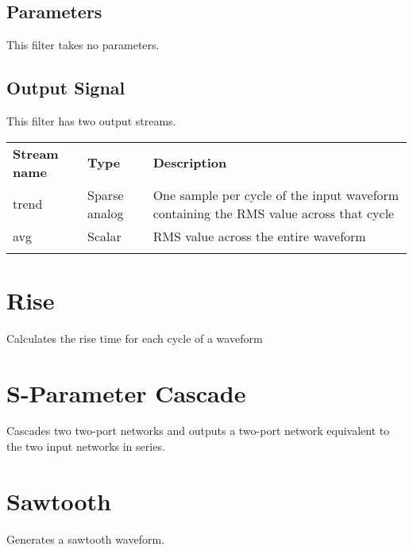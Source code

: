 \subsection{Parameters}

This filter takes no parameters.

\subsection{Output Signal}

This filter has two output streams.

\begin{tabularx}{16cm}{llX}
\thickhline
\textbf{Stream name} & \textbf{Type} & \textbf{Description} \\
\thickhline
trend & Sparse analog & One sample per cycle of the input waveform containing the RMS value across that cycle \\
\thinhline
avg & Scalar & RMS value across the entire waveform \\
\thickhline
\end{tabularx}

\pagebreak
\section{Rise}

Calculates the rise time for each cycle of a waveform

\pagebreak
\section{S-Parameter Cascade}
\label{filter:sparamcascade}

Cascades two two-port networks and outputs a two-port network equivalent to the two input networks in series.

\pagebreak
\section{Sawtooth}

Generates a sawtooth waveform.

\pagebreak
